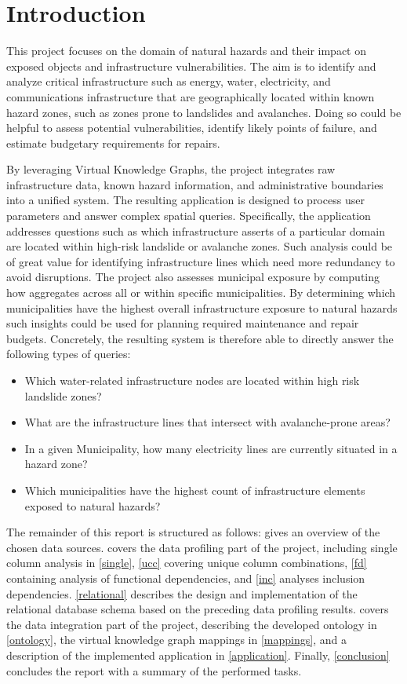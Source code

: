 
\section{Introduction} \label{into}

This project focuses on the domain of natural hazards and their impact on exposed objects and infrastructure vulnerabilities. The aim is to identify and analyze critical infrastructure such as energy, water, electricity, and communications infrastructure that are geographically located within known hazard zones, such as zones prone to landslides and avalanches. Doing so could be helpful to assess potential vulnerabilities, identify likely points of failure, and estimate budgetary requirements for repairs.

By leveraging Virtual Knowledge Graphs, the project integrates raw infrastructure data, known hazard information, and administrative boundaries into a unified system. The resulting application is designed to process user parameters and answer complex spatial queries. Specifically, the application addresses questions such as which infrastructure asserts of a particular domain are located within high-risk landslide or avalanche zones. Such analysis could be of great value for identifying infrastructure lines which need more redundancy to avoid disruptions. The project also assesses municipal exposure by computing how aggregates across all or within specific municipalities. By determining which municipalities have the highest overall infrastructure exposure to natural hazards such insights could be used for planning required maintenance and repair budgets.
Concretely, the resulting system is therefore able to directly answer the following types of queries:
\begin{itemize}
  \item Which water-related infrastructure nodes are located within high risk landslide zones?
  \item What are the infrastructure lines that intersect with avalanche-prone areas?
  \item In a given Municipality, how many electricity lines are currently situated in a hazard zone?
  \item Which municipalities have the highest count of infrastructure elements exposed to natural hazards?
\end{itemize}

The remainder of this report is structured as follows:
 gives an overview of the chosen data sources.  covers the data profiling part of the project, including single column analysis in \cref{single}, \cref{ucc} covering unique column combinations, \cref{fd} containing analysis of functional dependencies, and \cref{inc} analyses inclusion dependencies. \cref{relational} describes the design and implementation of the relational database schema based on the preceding data profiling results.
 covers the data integration part of the project, describing the developed ontology in \cref{ontology}, the virtual knowledge graph mappings in \cref{mappings}, and a description of the implemented application in \cref{application}.
Finally, \cref{conclusion} concludes the report with a summary of the performed tasks.
